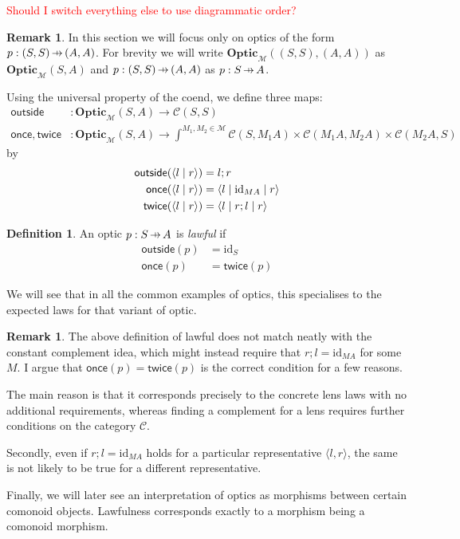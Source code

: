 \documentclass[11pt,a4paper]{article}
\theoremstyle{plain}
\theoremstyle{definition}
\newtheorem{definition}[theorem]{Definition}
\newtheorem{remark}[theorem]{Remark}
\newcommand{\C}{\mathscr{C}}
\newcommand{\M}{\mathscr{M}}
\newcommand{\Optic}{\mathbf{Optic}}
\newcommand{\id}{\mathrm{id}}
\newcommand{\rep}[2]{{\ensuremath \left\langle #1 \mid #2 \right\rangle}}
\newcommand{\repthree}[3]{{\ensuremath \langle #1 \mid #2 \mid #3 \rangle}}
\newcommand{\outside}{\mathsf{outside}}
\newcommand{\once}{\mathsf{once}}
\newcommand{\twice}{\mathsf{twice}}
\newcommand{\hto}{\ensuremath{\,\mathaccent\shortmid\rightarrow\,}}
\newcommand{\todo}[1]{\textcolor{red}{\small #1}}
\begin{document}
\todo{Should I switch everything else to use diagrammatic order?}

\begin{remark}
  In this section we will focus only on optics of the form $p : (S,S) \hto (A, A)$. For brevity we will write $\Optic_\M((S, S), (A, A))$ as $\Optic_\M(S, A)$ and $p : (S, S) \hto (A, A)$ as $p : S \hto A$.
\end{remark}

Using the universal property of the coend, we define three maps:
\begin{align*}
  \outside &: \Optic_\M(S, A) \to \C(S, S) \\
  \once, \twice &: \Optic_\M(S, A) \to \int^{M_1, M_2 \in \M} \C(S, M_1 A) \times \C(M_1 A, M_2 A) \times \C(M_2 A, S)
\end{align*}
by
\begin{align*}
  \outside(\rep{l}{r}) &= l;r \\
  \once(\rep{l}{r}) &= \repthree{l}{\id_{MA}}{r} \\
  \twice(\rep{l}{r}) &= \repthree{l}{r;l}{r}
\end{align*}

\begin{definition}
  An optic $p : S \hto A$ is \emph{lawful} if
  \begin{align*}
    \outside(p) &= \id_S \\
    \once(p) &= \twice(p)
  \end{align*}
\end{definition}

We will see that in all the common examples of optics, this specialises to the expected laws for that variant of optic.

\begin{remark}
The above definition of lawful does not match neatly with the constant complement idea, which might instead require that $r;l = \id_{MA}$ for some $M$. I argue that $\once(p) = \twice(p)$ is the correct condition for a few reasons. 

The main reason is that it corresponds precisely to the concrete lens laws with no additional requirements, whereas finding a complement for a lens requires further conditions on the category $\C$.

Secondly, even if $r;l = \id_{MA}$ holds for a particular representative $\langle l, r \rangle$, the same is not likely to be true for a different representative. 

Finally, we will later see an interpretation of optics as morphisms between certain comonoid objects. Lawfulness corresponds exactly to a morphism being a comonoid morphism.
\end{remark}
\end{document}
